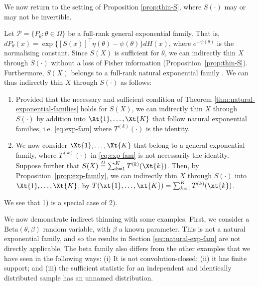 \documentclass[12pt]{article}
\begin{document}
We now return to the setting of Proposition \ref{prop:thin-S}, where $S(\cdot)$ may or may not be invertible.

\begin{remark}
\label{remark:genexp}
Let $\mathcal{P} = \{P_\theta: \theta \in \Omega\}$ be a full-rank general exponential family. That is, $dP_\theta(x) = \exp\{[S(x)]^\top\eta(\theta) - \psi(\theta)\}dH(x)$,
where $e^{-\psi(\theta)}$ is the normalising constant. Since $S(X)$ is sufficient for $\theta$, we can  indirectly thin $X$ through $S(\cdot)$ without a loss of Fisher information (Proposition~\ref{prop:thin-S}). 
Furthermore,  $S(X)$ belongs to a full-rank natural exponential family \citep[Lemma~2.7.2(i)]{lehmann2005testing}. We can thus indirectly thin $X$ through $S(\cdot)$ as follows: 
\begin{enumerate}
\item Provided that the necessary and sufficient condition of Theorem \ref{thm:natural-exponential-families} holds for $S(X)$, we can indirectly thin $X$ through $S(\cdot)$ by addition into $\Xt{1},\ldots,\Xt{K}$ that follow natural exponential families, i.e. \eqref{eq:exp-fam} where $T^{(k)}(\cdot)$ is the identity.
\item  We now consider $\Xt{1},\ldots,\Xt{K}$ that belong to a general exponential family, where
 $T^{(k)}(\cdot)$ in \eqref{eq:exp-fam} is not necessarily the identity. Suppose further that
$S(X)\overset{D}{=}\sum_{k=1}^KT^{(k)}(\Xt{k})$. 
 Then, by Proposition~\ref{prop:exp-family}, we can indirectly thin $X$ through $S(\cdot)$ into 
$\Xt{1},\ldots,\Xt{K}$,
by  $T(\xt{1},\ldots,\xt{K})=\sum_{k=1}^KT^{(k)}(\xt{k})$.
  
\end{enumerate}
We see that 1) is a special case of 2). 
\end{remark}

We now demonstrate indirect thinning with some examples.   
First, we consider a $\text{Beta}(\theta,\beta)$ random variable, with $\beta$ a known parameter. This is not a natural exponential family, and so the results in Section \ref{sec:natural-exp-fam} are not directly applicable.  The beta family also differs from the other examples that we have seen in the following ways:  (i)  It is not convolution-closed; (ii) it has finite support; and (iii) the sufficient statistic for an independent and identically distributed sample has an unnamed distribution. 
\end{document}
